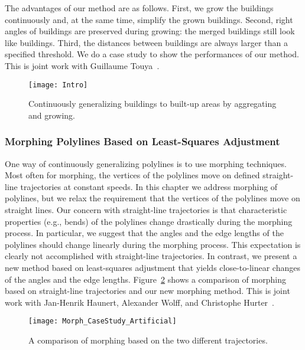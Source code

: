 The advantages of our method are as follows. 
First, we grow the buildings continuously 
and, at the same time, simplify the grown buildings.
Second, right angles of buildings are preserved during growing: 
the merged buildings still look like buildings. 
Third, the distances between buildings are 
always larger than a specified threshold.
We do a case study to show the performances of our method.
This is joint work with 
Guillaume Touya~\parencite[see][]{Peng2017Building}.

\begin{figure}[tb]
\centering
\texttt{[image: Intro]}
\caption{Continuously generalizing buildings to built-up 
	areas by aggregating and growing.}
\label{fig:Intro_BldgGrow}
\end{figure}


\subsubsection{Morphing Polylines 
	Based on Least-Squares Adjustment}

One way of continuously generalizing polylines 
is to use morphing techniques. 
Most often for morphing, 
the vertices of the polylines move on 
defined straight-line trajectories at constant speeds.
In this chapter we address morphing of polylines, 
but we relax the requirement that 
the vertices of the polylines move on straight lines. 
Our concern with straight-line trajectories is that 
characteristic properties (e.g., bends) of the polylines 
change drastically during the morphing process. 
In particular, we suggest that 
the angles and the edge lengths of the polylines 
should change linearly during the morphing process. 
This expectation is clearly not accomplished 
with straight-line trajectories. 
In contrast, we present a new method 
based on least-squares adjustment 
that yields close-to-linear changes of 
the angles and the edge lengths. 
Figure~\ref{fig:Intro_LSA_Compare} 
shows a comparison of morphing based on 
straight-line trajectories and our new morphing method.
This is joint work 
with Jan-Henrik Haunert, Alexander Wolff, 
and Christophe Hurter~\parencite[see][]{Peng2013LSA}.

\begin{figure}[htb]
\centering
\texttt{[image: Morph\_CaseStudy\_Artificial]}
\caption{A comparison of morphing 
    based on the two different trajectories.}
\label{fig:Intro_LSA_Compare}
\end{figure}

